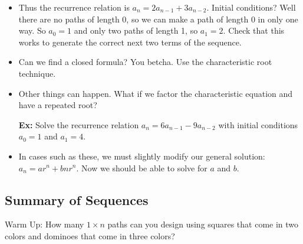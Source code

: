 \documentclass[12pt]{article}
\theoremstyle{plain}
\theoremstyle{definition}
\theoremstyle{remark}
\newcommand{\ex}{\noindent\textbf{Ex:} }
\newcommand{\todayis}[1]{\clearpage{\rhead{\footnotesize #1}}}
\begin{document}
\begin{itemize}
  \item Thus the recurrence relation is $a_n = 2a_{n-1} + 3a_{n-2}$.  Initial conditions?  Well there are no paths of length 0, so we can make a path of length 0 in only one way.  So $a_0 = 1$ and only two paths of length 1, so $a_1 = 2$.  Check that this works to generate the correct next two terms of the sequence.

  \item Can we find a closed formula?  You betcha.  Use the characteristic root technique.

  \item Other things can happen.  What if we factor the characteristic equation and have a repeated root?

  \ex  Solve the recurrence relation $a_n = 6a_{n-1} - 9a_{n-2}$ with initial conditions $a_0 = 1$ and $a_1 = 4$.

  \item In cases such as these, we must slightly modify our general solution: $a_n = ar^n + bnr^n$.  Now we should be able to solve for $a$ and $b$.
 \end{itemize}



\todayis{Friday, November 2}



\subsection*{Summary of Sequences}
Warm Up: How many $1\times n$ paths can you design using squares that come in two colors and dominoes that come in three colors?
\end{document}
